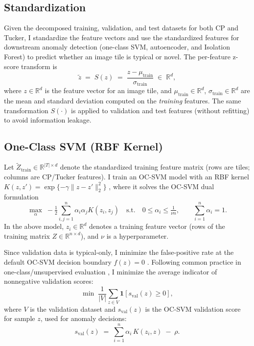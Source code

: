 \documentclass[pdflatex,sn-mathphys-ay]{sn-jnl}
\begin{document}
\subsection{Standardization}

Given the decomposed training, validation, and test datasets for both CP and Tucker, I standardize the feature vectors and use the standardized features for downstream anomaly detection (one-class SVM, autoencoder, and Isolation Forest) to predict whether an image tile is typical or novel. The per-feature z-score transform is
\[
\tilde{z} \;=\; S(z) \;=\; \frac{z - \mu_{\text{train}}}{\sigma_{\text{train}}} \;\in\; \mathbb{R}^{d},
\]
where \(z\in\mathbb{R}^{d}\) is the feature vector for an image tile, and \(\mu_{\text{train}}\in\mathbb{R}^{d}\), \(\sigma_{\text{train}}\in\mathbb{R}^{d}\) are the mean and standard deviation computed on the \emph{training} features. The same transformation \(S(\cdot)\) is applied to validation and test features (without refitting) to avoid information leakage.

\subsection{One-Class SVM (RBF Kernel)}

Let \(\tilde{Z}_{\text{train}}\in\mathbb{R}^{|T|\times d}\) denote the standardized training feature matrix (rows are tiles; columns are CP/Tucker features). I train an OC-SVM model with an RBF kernel \(K(z,z')=\exp\{-\gamma\lVert z-z'\rVert_2^2\}\) \citep{Scholkopf2001,TaxDuin2004}, where it solves the OC-SVM dual formulation
\[
\max_{\alpha}\; -\tfrac{1}{2} \sum_{i,j=1}^{n} \alpha_i \alpha_j K(z_i, z_j)
\quad \text{s.t.} \quad
0 \leq \alpha_i \leq \tfrac{1}{\nu n}, \qquad
\sum_{i=1}^{n} \alpha_i = 1.
\]
In the above model, \(z_i \in \mathbb{R}^{d}\) denotes a training feature vector (rows of the training matrix \(Z\in\mathbb{R}^{n\times d}\)), and \(\nu\) is a hyperparameter.

\noindent Since validation data is typical-only, I minimize the false-positive rate at the default OC-SVM decision boundary \(f(z)=0\) \citep{Scholkopf2001,TaxDuin2004}. Following common practice in one-class/unsupervised evaluation \citep{Chandola2009,Campos2016,Ruff2021}, I minimize the average indicator of nonnegative validation scores:
\[
\min \; \frac{1}{|V|} \sum_{z \in V} \mathbf{1}\!\left[ s_{\text{val}}(z) \geq 0 \right],
\]
where \(V\) is the validation dataset and \(s_{\text{val}}(z)\) is the OC-SVM validation score for sample \(z\), used for anomaly decisions:
\[
s_{\text{val}}(z) \;=\; \sum_{i=1}^{n} \alpha_i\, K(z_i, z) \;-\; \rho.
\]
\end{document}
